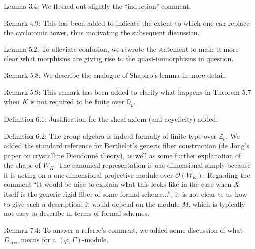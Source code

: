 \documentclass[12pt]{amsart}
\begin{document}
Lemma 3.4: We fleshed out slightly the ``induction'' comment.

Remark 4.9: This has been added to indicate the extent to which one can replace the cyclotomic tower, thus motivating the subsequent discussion.

Lemma 5.2: To alleviate confusion, we rewrote the statement to make it more clear what morphisms are giving rise to the quasi-isomorphisms in question.

Remark 5.8: We describe the analogue of Shapiro's lemma in more detail.

Remark 5.9: This remark has been added to clarify what happens in Theorem 5.7 when $K$ is not required to be finite over $\mathbb{Q}_p$.

Definition 6.1: Justification for the sheaf axiom (and acyclicity) added.

Definition 6.2: The group algebra is indeed formally of finite type over $\mathbb{Z}_p$. We added the standard reference for Berthelot's generic fiber construction (de Jong's paper on crystalline Dieudonn\'e theory), as well as some further explanation of the shape of $W_K$. The canonical representation is one-dimensional simply because it is acting on a one-dimensional projective module over $\mathcal{O}(W_K)$. Regarding the comment ``It would be nice to explain what this looks like in the case when $X$ itself is the generic rigid fiber of some formal scheme...'', it is not clear to us how to give such a description; it would depend on the module $M$, which is typically not easy to describe in terms of formal schemes.

Remark 7.4: To answer a referee's comment, we added some discussion of what $D_{\mathrm{crys}}$ means for a $(\varphi, \Gamma)$-module.
\end{document}
